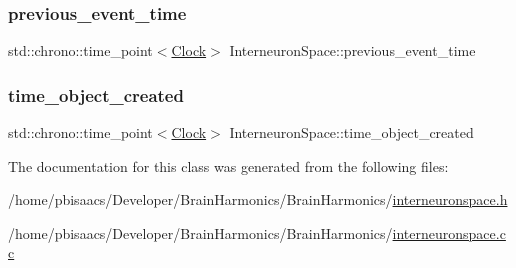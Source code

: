 \mbox{\label{classInterneuronSpace_a28efcbf608d5dd02f9dd85bec76a7650}} 
\subsubsection{\texorpdfstring{previous\+\_\+event\+\_\+time}{previous\_event\_time}}
{\footnotesize\ttfamily std\+::chrono\+::time\+\_\+point$<$\mbox{\hyperlink{universe_8h_a0ef8d951d1ca5ab3cfaf7ab4c7a6fd80}{Clock}}$>$ Interneuron\+Space\+::previous\+\_\+event\+\_\+time\hspace{0.3cm}{\ttfamily [private]}}

\mbox{\label{classInterneuronSpace_a5504d64df22fd330cdd14b4aca0171ea}} 
\subsubsection{\texorpdfstring{time\+\_\+object\+\_\+created}{time\_object\_created}}
{\footnotesize\ttfamily std\+::chrono\+::time\+\_\+point$<$\mbox{\hyperlink{universe_8h_a0ef8d951d1ca5ab3cfaf7ab4c7a6fd80}{Clock}}$>$ Interneuron\+Space\+::time\+\_\+object\+\_\+created\hspace{0.3cm}{\ttfamily [private]}}



The documentation for this class was generated from the following files\+:\begin{DoxyCompactItemize}
\item 
/home/pbisaacs/\+Developer/\+Brain\+Harmonics/\+Brain\+Harmonics/\mbox{\hyperlink{interneuronspace_8h}{interneuronspace.\+h}}\item 
/home/pbisaacs/\+Developer/\+Brain\+Harmonics/\+Brain\+Harmonics/\mbox{\hyperlink{interneuronspace_8cc}{interneuronspace.\+cc}}\end{DoxyCompactItemize}
